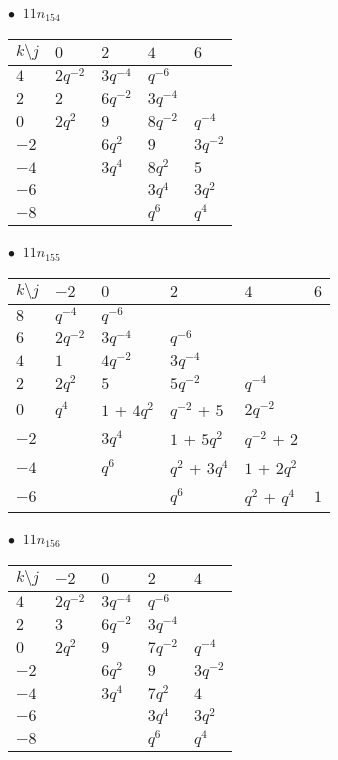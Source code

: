 \begin{minipage}{\linewidth}
$\bullet\ $ $11n_{154}$ \vspace{0.5em} \\
\begin{tabular}{l|llll}
$k \setminus j$ & $0$ & $2$ & $4$ & $6$ \\
\hline
$4$ & $2q^{-2}$ & $3q^{-4}$ & $q^{-6}$ &  \\
$2$ & $2$ & $6q^{-2}$ & $3q^{-4}$ &  \\
$0$ & $2q^{2}$ & $9$ & $8q^{-2}$ & $q^{-4}$ \\
$-2$ &  & $6q^{2}$ & $9$ & $3q^{-2}$ \\
$-4$ &  & $3q^{4}$ & $8q^{2}$ & $5$ \\
$-6$ &  &  & $3q^{4}$ & $3q^{2}$ \\
$-8$ &  &  & $q^{6}$ & $q^{4}$ \\
\end{tabular}
\vspace{2em}
\end{minipage}
%
\begin{minipage}{\linewidth}
$\bullet\ $ $11n_{155}$ \vspace{0.5em} \\
\begin{tabular}{l|lllll}
$k \setminus j$ & $-2$ & $0$ & $2$ & $4$ & $6$ \\
\hline
$8$ & $q^{-4}$ & $q^{-6}$ &  &  &  \\
$6$ & $2q^{-2}$ & $3q^{-4}$ & $q^{-6}$ &  &  \\
$4$ & $1$ & $4q^{-2}$ & $3q^{-4}$ &  &  \\
$2$ & $2q^{2}$ & $5$ & $5q^{-2}$ & $q^{-4}$ &  \\
$0$ & $q^{4}$ & $1$ + $4q^{2}$ & $q^{-2}$ + $5$ & $2q^{-2}$ &  \\
$-2$ &  & $3q^{4}$ & $1$ + $5q^{2}$ & $q^{-2}$ + $2$ &  \\
$-4$ &  & $q^{6}$ & $q^{2}$ + $3q^{4}$ & $1$ + $2q^{2}$ &  \\
$-6$ &  &  & $q^{6}$ & $q^{2}$ + $q^{4}$ & $1$ \\
\end{tabular}
\vspace{2em}
\end{minipage}
%
\begin{minipage}{\linewidth}
$\bullet\ $ $11n_{156}$ \vspace{0.5em} \\
\begin{tabular}{l|llll}
$k \setminus j$ & $-2$ & $0$ & $2$ & $4$ \\
\hline
$4$ & $2q^{-2}$ & $3q^{-4}$ & $q^{-6}$ &  \\
$2$ & $3$ & $6q^{-2}$ & $3q^{-4}$ &  \\
$0$ & $2q^{2}$ & $9$ & $7q^{-2}$ & $q^{-4}$ \\
$-2$ &  & $6q^{2}$ & $9$ & $3q^{-2}$ \\
$-4$ &  & $3q^{4}$ & $7q^{2}$ & $4$ \\
$-6$ &  &  & $3q^{4}$ & $3q^{2}$ \\
$-8$ &  &  & $q^{6}$ & $q^{4}$ \\
\end{tabular}
\vspace{2em}
\end{minipage}

